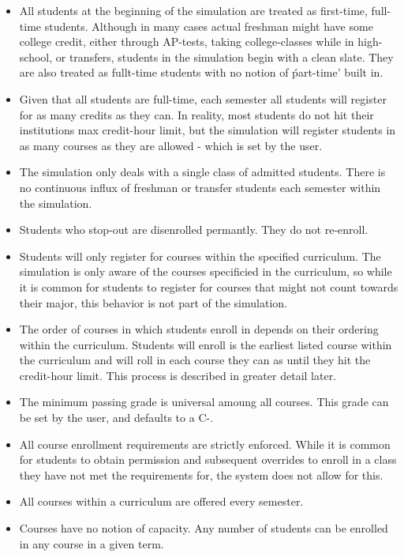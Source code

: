 \documentclass[botnum, fleqn]{unmeethesis}
\begin{document}
\begin{itemize}
  \item All students at the beginning of the simulation are treated as first-time, full-time students. Although in many cases actual freshman might have some college credit, either through AP-tests, taking college-classes while in high-school, or transfers, students in the simulation begin with a clean slate. They are also treated as fullt-time students with no notion of \'part-time' built in.
  \item Given that all students are full-time, each semester all students will register for as many credits as they can. In reality, most students do not hit their institutions max credit-hour limit, but the simulation will register students in as many courses as they are allowed - which is set by the user.
  \item The simulation only deals with a single class of admitted students. There is no continuous influx of freshman or transfer students each semester within the simulation.
  \item Students who stop-out are disenrolled permantly. They do not re-enroll.
  \item Students will only register for courses within the specified curriculum. The simulation is only aware of the courses specificied in the curriculum, so while it is common for students to register for courses that might not count towards their major, this behavior is not part of the simulation.
  \item The order of courses in which students enroll in depends on their ordering within the curriculum. Students will enroll is the earliest listed course within the curriculum and will roll in each course they can as until they hit the credit-hour limit. This process is described in greater detail later.
  \item The minimum passing grade is universal amoung all courses. This grade can be set by the user, and defaults to a C-.
  \item All course enrollment requirements are strictly enforced. While it is common for students to obtain permission and subsequent overrides to enroll in a class they have not met the requirements for, the system does not allow for this.
  \item All courses within a curriculum are offered every semester.
  \item Courses have no notion of capacity. Any number of students can be enrolled in any course in a given term.
\end{itemize}
\end{document}
